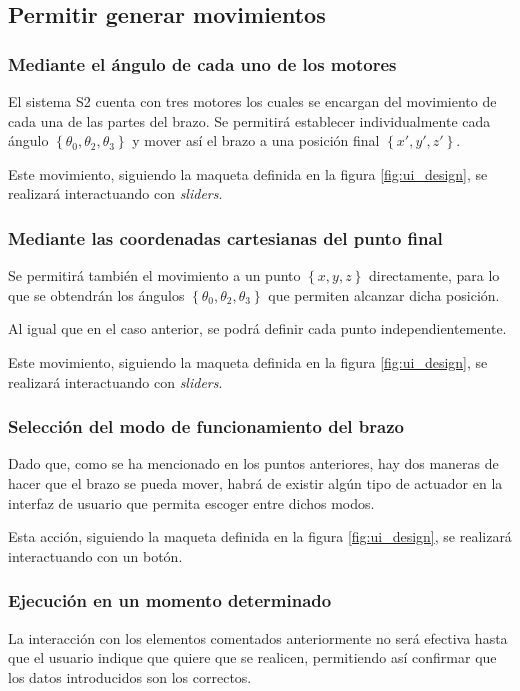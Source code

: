 \subsection{Permitir generar movimientos}
\subsubsection*{Mediante el ángulo de cada uno de los motores}
El sistema \ac{S2} cuenta con tres motores los cuales se encargan del movimiento de cada una de las partes del
brazo. Se permitirá establecer individualmente cada ángulo $\left\{\theta_0, \theta_2, \theta_3\right\}$ 
y mover así el brazo a una posición final $\left\{x', y', z'\right\}$.

Este movimiento, siguiendo la maqueta definida en la figura \ref{fig:ui_design}, se realizará interactuando
con \textit{sliders}.

\subsubsection*{Mediante las coordenadas cartesianas del punto final}
Se permitirá también el movimiento a un punto $\left\{x, y, z\right\}$ directamente, para lo que se obtendrán
los ángulos $\left\{\theta_0, \theta_2, \theta_3\right\}$ que permiten alcanzar dicha posición.

Al igual que en el caso anterior, se podrá definir cada punto independientemente.

Este movimiento, siguiendo la maqueta definida en la figura \ref{fig:ui_design}, se realizará interactuando
con \textit{sliders}.

\subsubsection*{Selección del modo de funcionamiento del brazo}
Dado que, como se ha mencionado en los puntos anteriores, hay dos maneras de hacer que el brazo se pueda
mover, habrá de existir algún tipo de actuador en la interfaz de usuario que permita escoger entre dichos modos.

Esta acción, siguiendo la maqueta definida en la figura \ref{fig:ui_design}, se realizará interactuando con
un botón.

\subsubsection*{Ejecución en un momento determinado}
La interacción con los elementos comentados anteriormente no será efectiva hasta que el usuario indique que
quiere que se realicen, permitiendo así confirmar que los datos introducidos son los correctos.

